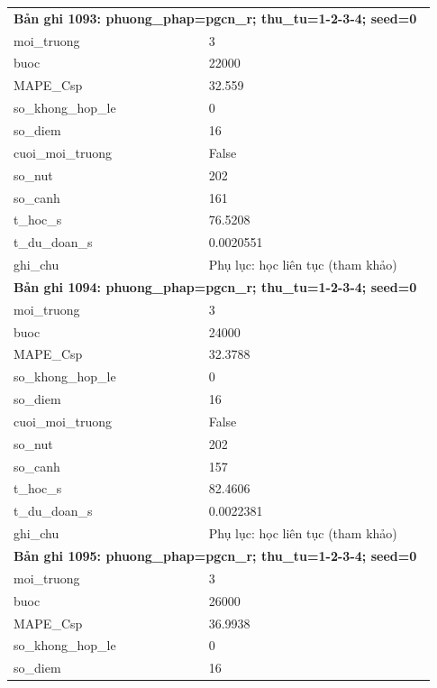 \begin{longtable}{p{0.43\linewidth}p{0.50\linewidth}}
\midrule
\multicolumn{2}{p{0.95\linewidth}}{\textbf{Bản ghi 1093: phuong\_phap=pgcn\_r; thu\_tu=1-2-3-4; seed=0}} \\
moi\_\allowbreak truong & 3 \\
buoc & 22000 \\
MAPE\_\allowbreak Csp & 32.559 \\
so\_\allowbreak khong\_\allowbreak hop\_\allowbreak le & 0 \\
so\_\allowbreak diem & 16 \\
cuoi\_\allowbreak moi\_\allowbreak truong & False \\
so\_\allowbreak nut & 202 \\
so\_\allowbreak canh & 161 \\
t\_\allowbreak hoc\_\allowbreak s & 76.5208 \\
t\_\allowbreak du\_\allowbreak doan\_\allowbreak s & 0.0020551 \\
ghi\_\allowbreak chu & Phụ lục: học liên tục (tham khảo) \\
\midrule
\multicolumn{2}{p{0.95\linewidth}}{\textbf{Bản ghi 1094: phuong\_phap=pgcn\_r; thu\_tu=1-2-3-4; seed=0}} \\
moi\_\allowbreak truong & 3 \\
buoc & 24000 \\
MAPE\_\allowbreak Csp & 32.3788 \\
so\_\allowbreak khong\_\allowbreak hop\_\allowbreak le & 0 \\
so\_\allowbreak diem & 16 \\
cuoi\_\allowbreak moi\_\allowbreak truong & False \\
so\_\allowbreak nut & 202 \\
so\_\allowbreak canh & 157 \\
t\_\allowbreak hoc\_\allowbreak s & 82.4606 \\
t\_\allowbreak du\_\allowbreak doan\_\allowbreak s & 0.0022381 \\
ghi\_\allowbreak chu & Phụ lục: học liên tục (tham khảo) \\
\midrule
\multicolumn{2}{p{0.95\linewidth}}{\textbf{Bản ghi 1095: phuong\_phap=pgcn\_r; thu\_tu=1-2-3-4; seed=0}} \\
moi\_\allowbreak truong & 3 \\
buoc & 26000 \\
MAPE\_\allowbreak Csp & 36.9938 \\
so\_\allowbreak khong\_\allowbreak hop\_\allowbreak le & 0 \\
so\_\allowbreak diem & 16 \\

\end{longtable}
